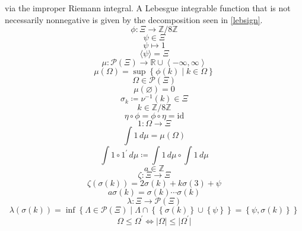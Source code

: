 \documentclass[12pt, letterpaper]{report}
\begin{document}
via the improper Riemann integral. A Lebesgue integrable function that is not necessarily nonnegative is given by the decomposition seen in \ref{lebsign}.\\
\[
    \phi :\Xi \to \mathbb{Z}/8\mathbb{Z}
\]
\[
    \psi \in \Xi 
\]
\[
    \psi \mapsto 1
\]
\[
    \langle \psi  \rangle =\Xi 
\]
\[
    \mu :\mathcal{P} (\Xi )\to \mathbb{R}\cup \left\langle -\infty,\infty \right\rangle 
\]
\[
    \mu (\Omega )=\sup \left\{ \phi (k) \mid k\in \Omega  \right\}
\]
\[
    \Omega \in \mathcal{P} (\Xi)
\]
\[
    \mu (\varnothing )=0
\]
\[
    \sigma_k \coloneqq \nu  ^{-1}  (k)\in \Xi
\]
\[
    k\in \mathbb{Z}/8\mathbb{Z}
\]
\[
    \eta \circ \phi = \phi \circ \eta  =\text{id} 
\]
\[
    1:\Omega \to \Xi 
\]
\[
    \int 1\,d \mu = \mu (\Omega )
\]
\[
    \int 1\circ 1^{\prime} \,d \mu \coloneqq \int1\,d \mu \circ \int1\,d \mu 
\]
\[
    a\in \mathbb{Z}
\]
\[
    \zeta :\Xi \to \Xi 
\]
\[
    \zeta \left( \sigma (k) \right) =2\sigma (k)+ k \sigma (3)+\psi 
\]
\[
    a \sigma (k) = \sigma (k) \cdots \sigma (k)
\]
\[
    \lambda : \Xi \to \mathcal{P} (\Xi )
\]
\[
    \lambda (\sigma (k))=\inf \left\{ \Lambda \in \mathcal{P} (\Xi ) \mid \Lambda \cap \left\{ \left\{ \sigma (k) \right\}\cup \left\{ \psi  \right\}   \right\} = \left\{ \psi ,\sigma (k) \right\}    \right\}
\]
\[
    \Omega \leq  \Omega^{\prime} \iff |\Omega | \leq  \vert \Omega ^{\prime}  \vert 
\]
\end{document}

